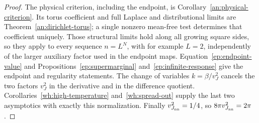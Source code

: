\begin{proof}
The physical criterion, including the endpoint, is
Corollary~\ref{an:physical-criterion}.  Its torus coefficient
and full Laplace and distributional limits are
Theorem~\ref{an:dirichlet-torus}; a single nonzero mean-free
test determines that coefficient uniquely.
Those structural limits hold along all growing square
sides, so they apply to every sequence $n=L^N$, with for
example $L=2$, independently of the larger auxiliary
factor used in the endpoint maps.
Equation~\eqref{ep:endpoint-value} and
Propositions~\ref{ep:supermarginal} and~\ref{ep:infinite-response}
give the endpoint and regularity statements.  The change
of variables $k=\beta/v_J^2$ cancels the two factors
$v_J^2$ in the derivative and in the difference quotient.
Corollaries~\ref{wh:high-temperature} and~\ref{wh:spread-out}
supply the last two asymptotics with exactly this
normalization.  Finally $v_{J_{\mathrm{nn}}}^2=1/4$, so
$8\pi v_{J_{\mathrm{nn}}}^2=2\pi$.
\end{proof}

